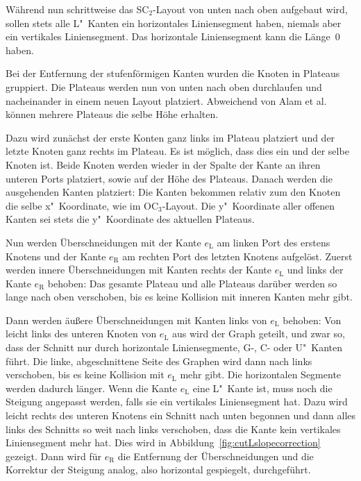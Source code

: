 \documentclass[a4paper]{scrreprt}
\theoremstyle{definition}
\begin{document}
Während nun schrittweise das SC$_2$-Layout von unten nach oben aufgebaut wird, sollen stets alle L"~Kanten ein horizontales Liniensegment haben, niemals aber ein vertikales Liniensegment. Das horizontale Liniensegment kann die Länge~0 haben.


Bei der Entfernung der stufenförmigen Kanten wurden die Knoten in Plateaus gruppiert. Die Plateaus werden nun von unten nach oben durchlaufen und nacheinander in einem neuen Layout platziert. Abweichend von Alam et al.~\cite{smooth-13} können mehrere Plateaus die selbe Höhe erhalten.

Dazu wird zunächst der erste Konten ganz links im Plateau platziert und der letzte Knoten ganz rechts im Plateau. Es ist möglich, dass dies ein und der selbe Knoten ist. Beide Knoten werden wieder in der Spalte der Kante an ihren unteren Ports platziert, sowie auf der Höhe des Plateaus. Danach werden die ausgehenden Kanten platziert: Die Kanten bekommen relativ zum den Knoten die selbe x"~Koordinate, wie im OC$_3$-Layout. Die y"~Koordinate aller offenen Kanten sei stets die y"~Koordinate des aktuellen Plateaus. 

Nun werden Überschneidungen mit der Kante $e_\text{L}$ am linken Port des erstens Knotens und der Kante $e_\text{R}$ am rechten Port des letzten Knotens aufgelöst. Zuerst werden innere Überschneidungen mit Kanten rechts der Kante $e_\text{L}$  und links der Kante $e_\text{R}$ behoben: Das gesamte Plateau und alle Plateaus darüber werden so lange nach oben verschoben, bis es keine Kollision mit inneren Kanten mehr gibt.

Dann werden äußere Überschneidungen mit Kanten links von $e_\text{L}$ behoben: Von leicht links des unteren Knoten von  $e_\text{L}$ aus wird der Graph geteilt, und zwar so, dass der Schnitt nur durch horizontale Liniensegmente, G-, C- oder U"~Kanten führt. Die linke, abgeschnittene Seite des Graphen wird dann nach links verschoben, bis es keine Kollision mit $e_\text{L}$ mehr gibt. Die horizontalen Segmente werden dadurch länger. Wenn die Kante $e_\text{L}$ eine L"~Kante ist, muss noch die Steigung angepasst werden, falls sie ein vertikales Liniensegment hat. Dazu wird leicht rechts des unteren Knotens ein Schnitt nach unten begonnen und dann alles links des Schnitts so weit nach links verschoben, dass die Kante kein vertikales Liniensegment mehr hat. Dies wird in Abbildung~\ref{fig:cutLslopecorrection} gezeigt. Dann wird für $e_\text{R}$ die Entfernung der Überschneidungen und die Korrektur der Steigung analog, also horizontal gespiegelt, durchgeführt.
\end{document}
